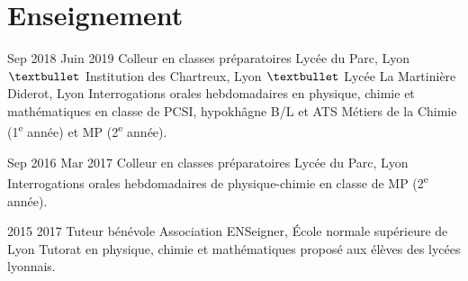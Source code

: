 \documentclass[letterpaper]{cvtemplate_fr} %
\begin{document}
\section{Enseignement}
\begin{cvbody}

\cvitem
	{Sep 2018}
	{Juin 2019}
	{Colleur en classes pr\'eparatoires}
	{Lyc\'ee du Parc, Lyon $\textbullet$ Institution des Chartreux, Lyon $\textbullet$ Lyc\'ee La Martinière Diderot, Lyon }
	{}
	{}
	{Interrogations orales hebdomadaires en physique, chimie et math\'ematiques en classe de PCSI, hypokh\^agne B/L et ATS M\'etiers de la Chimie (1\textsuperscript{e} ann\'ee) et MP (2\textsuperscript{e} ann\'ee).\\}

\cvitem
	{Sep 2016}
	{Mar 2017}
	{Colleur en classes pr\'eparatoires}
	{Lyc\'ee du Parc, Lyon }
	{}
	{}
	{Interrogations orales hebdomadaires de physique-chimie en classe de MP (2\textsuperscript{e} ann\'ee).\\}

\cvitem
	{2015}
	{2017}
	{Tuteur b\'en\'evole}
	{Association ENSeigner, \'Ecole normale sup\'erieure de Lyon }
	{}
	{}
	{Tutorat en physique, chimie et math\'ematiques propos\'e aux \'el\`eves des lyc\'ees lyonnais.}

\end{cvbody}
\end{document}
